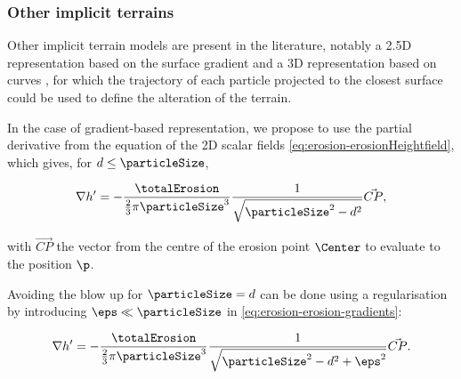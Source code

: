 



\subsubsection{Other implicit terrains}
\label{sec:erosion-application_on_other_implicit}
Other implicit terrain models are present in the literature, notably a 2.5D representation based on the surface gradient \cite{Guerin2022} and a 3D representation based on curves \cite{Becher2017}, for which the trajectory of each particle projected to the closest surface could be used to define the alteration of the terrain.

In the case of gradient-based representation, we propose to use the partial derivative from the equation of the 2D scalar fields \eqref{eq:erosion-erosionHeightfield}, which gives, for $d \leq \particleSize$,

\begin{align}
    \label{eq:erosion-erosion-gradients}
    \nabla h' = - \frac{\totalErosion}{\frac{2}{3} \pi \particleSize^3} \frac{1}{\sqrt{\particleSize^2 - d^2} } \vec{CP},
\end{align}

with $\vec{CP}$ the vector from the centre of the erosion point $\Center$ to evaluate to the position $\p$.

Avoiding the blow up for $\particleSize = d$ can be done using a regularisation by introducing $\eps \ll \particleSize$ in \cref{eq:erosion-erosion-gradients}:

\begin{align}
    \label{eq:erosion-erosion-gradients-corrected}
    \nabla h' = - \frac{\totalErosion}{\frac{2}{3} \pi \particleSize^3} \frac{1}{\sqrt{\particleSize^2 - d^2 + \eps^2} } \vec{CP}.
\end{align}

